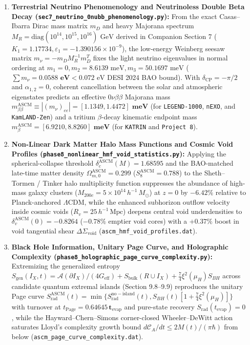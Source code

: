\documentclass[aps,prd,onecolumn,superscriptaddress,nofootinbib,longbibliography,10pt]{revtex4-2}
\begin{document}
\begin{enumerate}
  
\item \textbf{Terrestrial Neutrino Phenomenology and Neutrinoless Double Beta Decay (\texttt{sec7_neutrino_0nubb_phenomenology.py}):} From the exact Casas–Ibarra Dirac mass matrix \(m_D\) and heavy Majorana spectrum \(M_R = \mathrm{diag}(10^{14}, 10^{15}, 10^{16})\text{ GeV}\) derived in Companion Section 7 (\(K_1 = 1.17734, \varepsilon_1 = -1.390156 \times 10^{-9}\)), the low-energy Weinberg seesaw matrix \(m_\nu = -m_D M_R^{-1} m_D^T\) fixes the light neutrino eigenvalues in normal ordering at \(m_1 = 0, m_2 = 8.6139\text{ meV}, m_3 = 50.1697\text{ meV}\) (\(\sum m_\nu = \mathbf{0.0588\text{ eV}} < 0.072\text{ eV}\) DESI 2024 BAO bound). With \(\delta_{\mathrm{CP}} = -\pi/2\) and \(\alpha_{1,2} = 0\), coherent cancellation between the solar and atmospheric eigenstates predicts an effective \(0\nu\beta\beta\) Majorana mass \(m_{\beta\beta}^{\mathrm{ASCM}} \equiv |(m_\nu)_{ee}| = \mathbf{[1.1349, 1.4472]\text{ meV}}\) (for \texttt{LEGEND-1000}, \texttt{nEXO}, and \texttt{KamLAND-Zen}) and a tritium \(\beta\)-decay kinematic endpoint mass \(m_\beta^{\mathrm{ASCM}} = \mathbf{[6.9210, 8.8260]\text{ meV}}\) (for \texttt{KATRIN} and \texttt{Project 8}).
  
\item \textbf{Non-Linear Dark Matter Halo Mass Functions and Cosmic Void Profiles (\texttt{phase8_nonlinear_hmf_void_statistics.py}):} Applying the spherical-collapse threshold \(\delta_c^{\mathrm{ASCM}}(M) = 1.68595\) and the BAO-matched late-time matter density \(\Omega_{m,0}^{\mathrm{ASCM}} = 0.299\) (\(S_8^{\mathrm{ASCM}} = 0.788\)) to the Sheth–Tormen / Tinker halo multiplicity function suppresses the abundance of high-mass galaxy clusters (\(M_{200c} = 5 \times 10^{14}\,h^{-1}\,M_\odot\)) at \(z = 0\) by \(\mathbf{-6.42\%}\) relative to Planck-anchored $\Lambda$CDM, while the enhanced subhorizon outflow velocity inside cosmic voids (\(R_v = 25\,h^{-1}\,\mathrm{Mpc}\)) deepens central void underdensities to \(\delta_v^{\mathrm{ASCM}}(0) = \mathbf{-0.8264}\) (\(\mathbf{-0.78\%}\) emptier void cores) with a \(+0.37\%\) boost in void tangential shear \(\Delta\Sigma_{\mathrm{void}}\) (\texttt{ascm_hmf_void_profiles.dat}).
  
\item \textbf{Black Hole Information, Unitary Page Curve, and Holographic Complexity (\texttt{phase8_holographic_page_curve_complexity.py}):} Extremizing the generalized entropy \(S_{\mathrm{gen}}(I_X, t) = \mathcal{A}(\partial I_X)/(4G_{\mathrm{eff}}) + S_{\mathrm{bulk}}(R \cup I_X) + \frac{7}{4}\xi^2(\mu_H)S_{BH}\) across candidate quantum extremal islands (Section 9.8–9.9) reproduces the unitary Page curve \(S_{\mathrm{rad}}^{\mathrm{ASCM}}(t) = \min\{S_{\mathrm{rad}}^{\mathrm{no-island}}(t), S_{BH}(t)[1 + \frac{7}{4}\xi^2(\mu_H)]\}\) with turnover at \(t_{\mathrm{Page}} = \mathbf{0.64645\,t_{\mathrm{evap}}}\) and pure-state recovery \(S_{\mathrm{rad}}(t_{\mathrm{evap}}) = 0\), while the Hayward–Chern–Simons corner-closed Wheeler–DeWitt action saturates Lloyd's complexity growth bound \(d\mathcal{C}_A/dt \le 2M(t)/(\pi\hbar)\) from below (\texttt{ascm_page_curve_complexity.dat}).


\end{enumerate}
\end{document}
